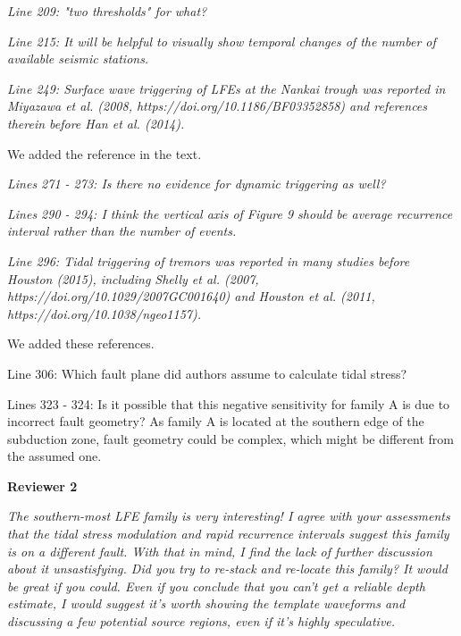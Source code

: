 \documentclass[letterpaper, 12pt]{article}
\begin{document}
\bigskip

\textit{Line 209: "two thresholds" for what?}

\bigskip

\textit{Line 215: It will be helpful to visually show temporal changes of the number of available seismic stations.}

\bigskip

\textit{Line 249: Surface wave triggering of LFEs at the Nankai trough was reported in Miyazawa et al. (2008, https://doi.org/10.1186/BF03352858) and references therein before Han et al. (2014).}

\bigskip

We added the reference in the text.

\bigskip

\textit{Lines 271 - 273: Is there no evidence for dynamic triggering as well?}

\bigskip

\textit{Lines 290 - 294: I think the vertical axis of Figure 9 should be average recurrence interval rather than the number of events.}

\bigskip

\textit{Line 296: Tidal triggering of tremors was reported in many studies before Houston (2015), including Shelly et al. (2007, https://doi.org/10.1029/2007GC001640) and Houston et al. (2011, https://doi.org/10.1038/ngeo1157).}

\bigskip

We added these references.

\bigskip

Line 306: Which fault plane did authors assume to calculate tidal stress?

Lines 323 - 324: Is it possible that this negative sensitivity for family A is due to incorrect fault geometry? As family A is located at the southern edge of the subduction zone, fault geometry could be complex, which might be different from the assumed one.

\bigskip

\textbf{Reviewer 2}

\bigskip

\textit{The southern-most LFE family is very interesting! I agree with your assessments that the tidal stress modulation and rapid recurrence intervals suggest this family is on a different fault. With that in mind, I find the lack of further discussion about it unsastisfying. Did you try to re-stack and re-locate this family? It would be great if you could. Even if you conclude that you can’t get a reliable depth estimate, I would suggest it’s worth showing the template waveforms and discussing a few potential source regions, even if it’s highly speculative.}
\end{document}
